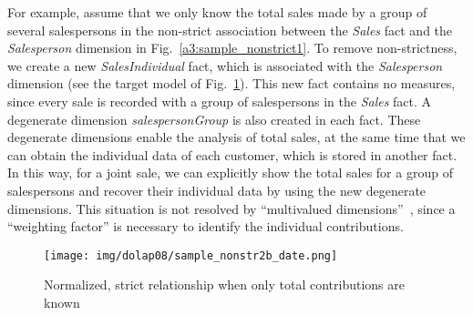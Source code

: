For example, assume that we only know the total sales made by a
group of several salespersons in the non-strict association between
the \emph{Sales} fact and the \emph{Salesperson} dimension in
Fig.~\ref{a3:sample_nonstrict1}. To remove non-strictness, we create
a new \emph{SalesIndividual} fact, which is associated with the
\emph{Salesperson} dimension (see the target model of
Fig.~\ref{a3:sample_nonstrict2b}). This new fact contains no
measures, since every sale is recorded with a group of salespersons
in the \emph{Sales} fact. A degenerate dimension
\emph{salespersonGroup} is also created in each fact. These
degenerate dimensions enable the analysis of total sales, at the
same time that we can obtain the individual data of each customer,
which is stored in another fact. In this way, for a joint sale, we
can explicitly show the total sales for a group of salespersons and
recover their individual data by using the new degenerate
dimensions.  This situation is not resolved by ``multivalued
dimensions''~\cite{book/Kimball/DW}, since a ``weighting factor'' is
necessary to identify the individual contributions.

\begin{figure}
\begin{center}
\texttt{[image: img/dolap08/sample\_nonstr2b\_date.png]}
\end{center}
\caption{Normalized, strict relationship when only total
contributions are known} \label{a3:sample_nonstrict2b}
\end{figure}

